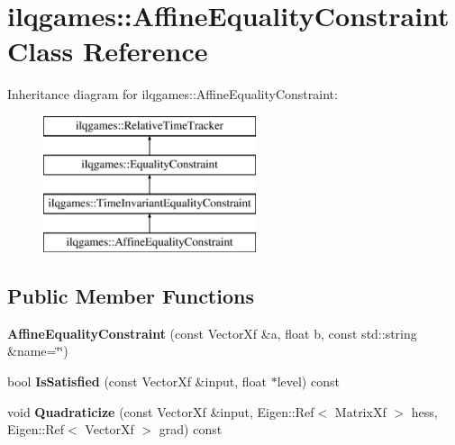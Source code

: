 \hypertarget{classilqgames_1_1_affine_equality_constraint}{}\section{ilqgames\+:\+:Affine\+Equality\+Constraint Class Reference}
\label{classilqgames_1_1_affine_equality_constraint}
Inheritance diagram for ilqgames\+:\+:Affine\+Equality\+Constraint\+:\begin{figure}[H]
\begin{center}
\leavevmode
\includegraphics[height=4.000000cm]{classilqgames_1_1_affine_equality_constraint}
\end{center}
\end{figure}
\subsection*{Public Member Functions}
\begin{DoxyCompactItemize}
\item 
{\bfseries Affine\+Equality\+Constraint} (const Vector\+Xf \&a, float b, const std\+::string \&name=\char`\"{}\char`\"{})\hypertarget{classilqgames_1_1_affine_equality_constraint_ab70260991b600fce43d5b04dbbad9d22}{}\label{classilqgames_1_1_affine_equality_constraint_ab70260991b600fce43d5b04dbbad9d22}

\item 
bool {\bfseries Is\+Satisfied} (const Vector\+Xf \&input, float $\ast$level) const \hypertarget{classilqgames_1_1_affine_equality_constraint_a34ef0e6ef665d6c069dfce4f8eed112e}{}\label{classilqgames_1_1_affine_equality_constraint_a34ef0e6ef665d6c069dfce4f8eed112e}

\item 
void {\bfseries Quadraticize} (const Vector\+Xf \&input, Eigen\+::\+Ref$<$ Matrix\+Xf $>$ hess, Eigen\+::\+Ref$<$ Vector\+Xf $>$ grad) const \hypertarget{classilqgames_1_1_affine_equality_constraint_a6cae844a67d42a4a9cc07917c1b771a7}{}\label{classilqgames_1_1_affine_equality_constraint_a6cae844a67d42a4a9cc07917c1b771a7}

\end{DoxyCompactItemize}
